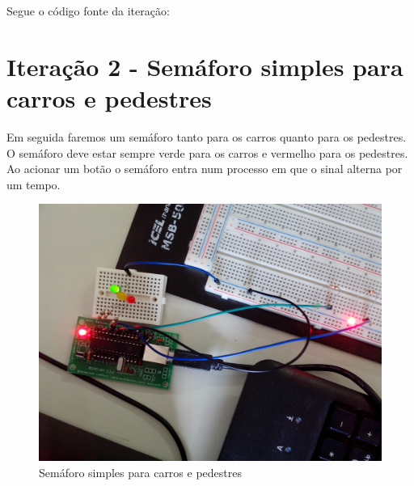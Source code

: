 Segue o código fonte da iteração:

\begin{Shaded}
\begin{Highlighting}[]

 

 \NormalTok{) \{}
     \NormalTok{(}\NormalTok{) \{}
        \NormalTok{);}

        \NormalTok{);}

        \NormalTok{);}
    \NormalTok{\}}
\NormalTok{\}}
\end{Highlighting}
\end{Shaded}
\newpage

\section{Iteração 2 - Semáforo simples para carros e pedestres}

Em seguida faremos um semáforo tanto para os carros quanto para os
pedestres. O semáforo deve estar sempre verde para os carros e vermelho
para os pedestres. Ao acionar um botão o semáforo entra num processo em
que o sinal alterna por um tempo.

\begin{figure}[H]
    \includegraphics[scale=0.15]{img/semaforo-2.jpg}
    \caption{Semáforo simples para carros e pedestres}
\end{figure}

